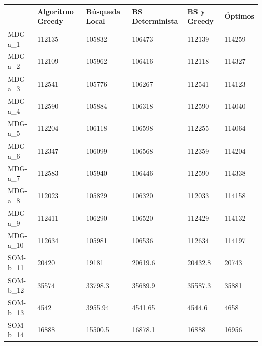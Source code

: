 \documentclass[11pt,a4paper]{article}
\begin{document}
	\begin{table}[H]
		\begin{tabular}{l|l|l|l|l|l|}
			\cline{2-6}
			& Algoritmo Greedy & Búsqueda Local & BS Determinista & BS y Greedy & Óptimos     \\ \hline
			\multicolumn{1}{|l|}{MDG-a\_1}  & 112135           & 105832         & 106473          & 112139      & 114259      \\ \hline
			\multicolumn{1}{|l|}{MDG-a\_2}  & 112109           & 105962         & 106416          & 112118      & 114327      \\ \hline
			\multicolumn{1}{|l|}{MDG-a\_3}  & 112541           & 105776         & 106267          & 112541      & 114123      \\ \hline
			\multicolumn{1}{|l|}{MDG-a\_4}  & 112590           & 105884         & 106318          & 112590      & 114040      \\ \hline
			\multicolumn{1}{|l|}{MDG-a\_5}  & 112204           & 106118         & 106598          & 112255      & 114064      \\ \hline
			\multicolumn{1}{|l|}{MDG-a\_6}  & 112347           & 106099         & 106568          & 112359      & 114204      \\ \hline
			\multicolumn{1}{|l|}{MDG-a\_7}  & 112583           & 105940         & 106446          & 112590      & 114338      \\ \hline
			\multicolumn{1}{|l|}{MDG-a\_8}  & 112023           & 105829         & 106320          & 112033      & 114158      \\ \hline
			\multicolumn{1}{|l|}{MDG-a\_9}  & 112411           & 106290         & 106520          & 112429      & 114132      \\ \hline
			\multicolumn{1}{|l|}{MDG-a\_10} & 112634           & 105981         & 106536          & 112634      & 114197      \\ \hline
			\multicolumn{1}{|l|}{SOM-b\_11} & 20420            & 19181          & 20619.6         & 20432.8     & 20743       \\ \hline
			\multicolumn{1}{|l|}{SOM-b\_12} & 35574            & 33798.3        & 35689.9         & 35587.3     & 35881       \\ \hline
			\multicolumn{1}{|l|}{SOM-b\_13} & 4542             & 3955.94        & 4541.65         & 4544.6      & 4658        \\ \hline
			\multicolumn{1}{|l|}{SOM-b\_14} & 16888            & 15500.5        & 16878.1         & 16888       & 16956       \\ \hline

\end{tabular}
\end{table}
\end{document}
